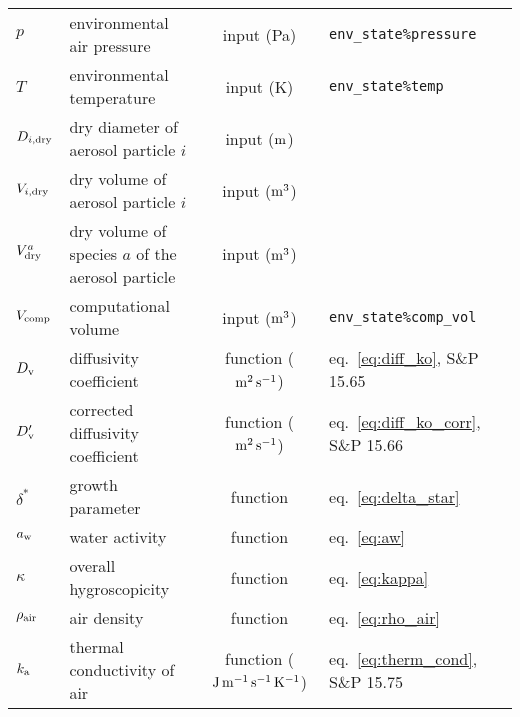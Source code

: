 \documentclass{article}
\begin{document}
\begin{tabular}{lp{4cm}clp{3cm}}
$p$                 & environmental air pressure                         & input (Pa)                                      & \verb+env_state%pressure+                 \\
$T$                 & environmental temperature                          & input (K)                                       & \verb+env_state%temp+                     \\
$D_{i,\rm dry}$       & dry diameter of aerosol particle $i$               & input ($\rm m$)                                 &                                           \\
$V_{i,\rm dry}$     & dry volume of aerosol particle $i$                 & input ($\rm m^3$)                               &                                           \\
$V_{\rm dry}^a$     & dry volume of species $a$ of the aerosol particle  & input ($\rm m^3$)                               &                                           \\
$V_{\rm comp}$      & computational volume                               & input ($\rm m^3$)                               & \verb+env_state%comp_vol+                 \\
\hline
$D_{\rm v}$         & diffusivity coefficient                            & function ($\rm m^2 \, s^{-1}$)                   & eq.~\ref{eq:diff_ko}, S\&P 15.65          \\
$D_{\rm v}'$        & corrected diffusivity coefficient                  & function ($\rm m^2 \, s^{-1}$)                   & eq.~\ref{eq:diff_ko_corr}, S\&P 15.66     \\
$\delta^*$          & growth parameter                                   & function                                        & eq.~\ref{eq:delta_star}                   \\
$a_{\rm w}$         & water activity                                     & function                                        & eq.~\ref{eq:aw}                           \\
$\kappa$            & overall hygroscopicity                             & function                                        & eq.~\ref{eq:kappa}                        \\
$\rho_{\rm air}$    & air density                                        & function                                        & eq.~\ref{eq:rho_air}                      \\
$k_{\rm a}$         & thermal conductivity of air                        & function ($\rm J \, m^{-1} \, s^{-1} \, K^{-1}$)   & eq.~\ref{eq:therm_cond}, S\&P 15.75       \\

\end{tabular}
\end{document}
